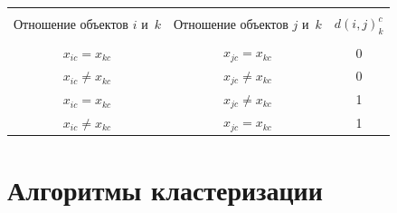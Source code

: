 







\begin{table}\small %


\begin{center}




\vspace*{2ex}





\tabcolsep=8.8pt


\begin{tabular}{|c|c|c|}


\hline


&&\\[-9pt]


Отношение объектов $i$ и~$k$&Отношение объектов $j$ и~$k$&$d(i,j)_k^c$\\[2pt]


\hline


&&\\[-9pt]


$x_{ic} = x_{kc}$&$x_{jc} = x_{kc}$&0\\


$x_{ic}\not= x_{kc}$&$x_{jc}\not= x_{kc}$&0\\


$x_{ic} = x_{kc}$&$x_{jc}\not= x_{kc}$&1\\


$x_{ic}\not= x_{kc}$&$x_{jc} = x_{kc}$&1\\[2pt]


\hline


\end{tabular}


\end{center}


\vspace*{-9pt}


\end{table}





\vspace*{-4pt}





\section{Алгоритмы кластеризации}





